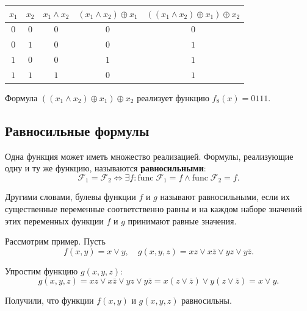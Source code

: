 \documentclass[a5paper, 11pt]{extarticle}
\theoremstyle{definition}
\theoremstyle{definition}
\theoremstyle{definition}
\numberwithin{figure}{section}
\numberwithin{table}{section}
\begin{document}
\begin{table}[H]
    \renewcommand*{\arraystretch}{1.5}
    \begin{longtable}{|c|c|c|c|c|}
        \hline
        \(x_1\) & \(x_2\) & \(x_1 \land x_2\) & \((x_1 \land x_2) \oplus x_1\) & \(((x_1 \land x_2) \oplus x_1) \oplus x_2\) \\
        \hline
        \(0\)   & \(0\)   & \(0\)             & \(0\)                          & \(0\)                                       \\
        \hline
        \(0\)   & \(1\)   & \(0\)             & \(0\)                          & \(1\)                                       \\
        \hline
        \(1\)   & \(0\)   & \(0\)             & \(1\)                          & \(1\)                                       \\
        \hline
        \(1\)   & \(1\)   & \(1\)             & \(0\)                          & \(1\)                                       \\
        \hline
    \end{longtable}
\end{table}

Формула \(((x_1 \land x_2) \oplus x_1) \oplus x_2\) реализует функцию \(f_8(x) = 0111\).

\subsection{Равносильные формулы}

Одна функция может иметь множество реализацией. Формулы, реализующие одну и ту же функцию, называются \textbf{равносильными}:
\[
    \mathcal{F}_1 = \mathcal{F}_2
    \iff
    \exists f: \text{func} \; \mathcal{F}_1 = f \land \text{func} \; \mathcal{F}_2 = f.
\]

Другими словами, булевы функции \(f\) и \(g\) называют равносильными, если их существенные переменные соответственно равны и на каждом наборе значений этих переменных функции \(f\) и \(g\) принимают равные значения.

Рассмотрим пример. Пусть
\[
    f(x, y) = x \lor y,
    \quad
    g(x, y, z) = xz \lor x \bar{z} \lor yz \lor y \bar{z}.
\]

Упростим функцию \(g(x, y, z)\):
\[
    g(x, y, z) =
    xz \lor x \bar{z} \lor yz \lor y \bar{z} =
    x(z \lor \bar{z}) \lor y(z \lor \bar{z}) =
    x \lor y.
\]

Получили, что функции \(f(x, y)\) и \(g(x, y, z)\) равносильны.
\end{document}
